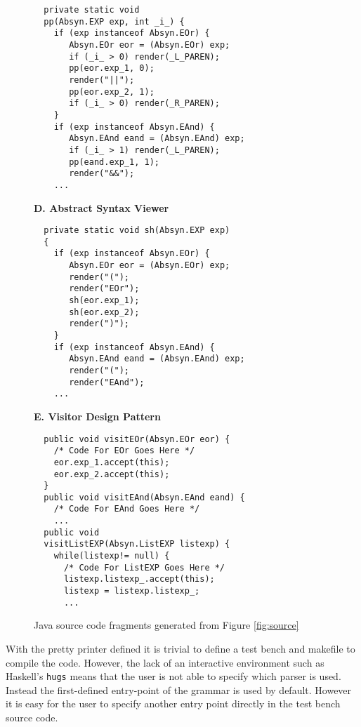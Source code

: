 \begin{figure}
\begin{boxedminipage}[t]{\textwidth}
\begin{minipage}[r]{0.5\textwidth}
\scriptsize
\begin{verbatim}
  private static void 
  pp(Absyn.EXP exp, int _i_) {
    if (exp instanceof Absyn.EOr) {
       Absyn.EOr eor = (Absyn.EOr) exp;
       if (_i_ > 0) render(_L_PAREN);
       pp(eor.exp_1, 0);
       render("||");
       pp(eor.exp_2, 1);
       if (_i_ > 0) render(_R_PAREN);
    }
    if (exp instanceof Absyn.EAnd) {
       Absyn.EAnd eand = (Absyn.EAnd) exp;
       if (_i_ > 1) render(_L_PAREN);
       pp(eand.exp_1, 1);
       render("&&");
    ...
\end{verbatim}
\normalsize
\textbf{D. Abstract Syntax Viewer}
\scriptsize
\begin{verbatim}
  private static void sh(Absyn.EXP exp)
  {
    if (exp instanceof Absyn.EOr) {
       Absyn.EOr eor = (Absyn.EOr) exp;
       render("(");
       render("EOr");
       sh(eor.exp_1);
       sh(eor.exp_2);
       render(")");
    }
    if (exp instanceof Absyn.EAnd) {
       Absyn.EAnd eand = (Absyn.EAnd) exp;
       render("(");
       render("EAnd");
    ...
\end{verbatim}
\normalsize

\textbf{E. Visitor Design Pattern}

\scriptsize
\begin{verbatim}
  public void visitEOr(Absyn.EOr eor) {
    /* Code For EOr Goes Here */
    eor.exp_1.accept(this);
    eor.exp_2.accept(this);
  }
  public void visitEAnd(Absyn.EAnd eand) {
    /* Code For EAnd Goes Here */
    ...
  public void 
  visitListEXP(Absyn.ListEXP listexp) {
    while(listexp!= null) {
      /* Code For ListEXP Goes Here */
      listexp.listexp_.accept(this);
      listexp = listexp.listexp_;
      ...
\end{verbatim}
\normalsize

\hfill
\end{minipage}
\end{boxedminipage}
\caption{Java source code fragments generated from Figure \ref{fig:source}}
\label{fig:java}
\end{figure}


With the pretty printer defined it is trivial to define a test bench and makefile to compile the code. However, the lack of an interactive environment such as Haskell's \texttt{hugs} means that the user is not able to specify which parser is used. Instead the first-defined entry-point of the grammar is used by default. However it is easy for the user to specify another entry point directly in the test bench source code.


